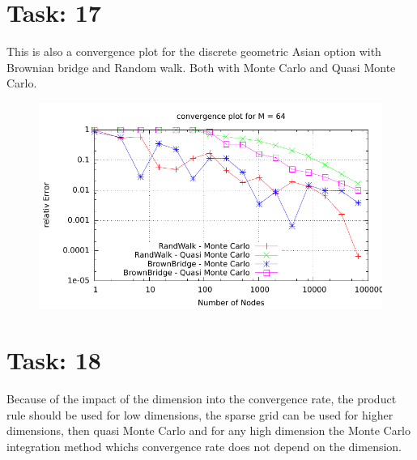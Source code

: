 \documentclass{article}
\begin{document}
\newpage

\section*{Task: 17}
This is also a convergence plot for the discrete geometric Asian option with Brownian bridge and Random walk. Both with Monte Carlo and Quasi Monte Carlo.
\begin{figure}[htbp]
  \centering
     \includegraphics[width=1.0\textwidth]{../Task17/sh3_task17_convergencePlot.pdf}
\end{figure}

\section*{Task: 18}

Because of the impact of the dimension into the convergence rate, 
the product rule should be used for low dimensions, 
the sparse grid can be used for higher dimensions, then quasi Monte Carlo and
for any high dimension the Monte Carlo integration method whichs convergence rate does not depend on the dimension. 
\end{document}
